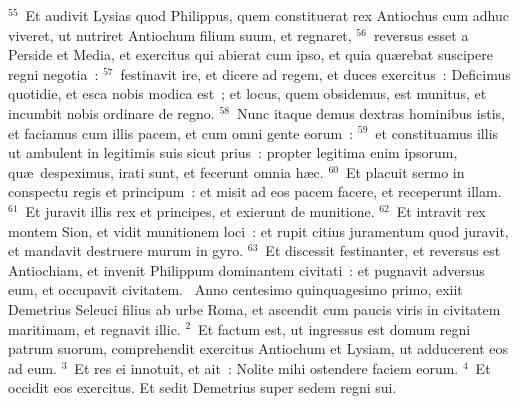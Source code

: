 ${}^{55}$~Et audivit Lysias quod Philippus, quem constituerat rex Antiochus cum adhuc viveret, ut nutriret Antiochum filium suum, et regnaret,
${}^{56}$~reversus esset a Perside et Media, et exercitus qui abierat cum ipso, et quia qu\ae rebat suscipere regni negotia~:
${}^{57}$~festinavit ire, et dicere ad regem, et duces exercitus~: Deficimus quotidie, et esca nobis modica est~; et locus, quem obsidemus, est munitus, et incumbit nobis ordinare de regno.
${}^{58}$~Nunc itaque demus dextras hominibus istis, et faciamus cum illis pacem, et cum omni gente eorum~:
${}^{59}$~et constituamus illis ut ambulent in legitimis suis sicut prius~: propter legitima enim ipsorum, qu\ae\ despeximus, irati sunt, et fecerunt omnia h\ae c.
${}^{60}$~Et placuit sermo in conspectu regis et principum~: et misit ad eos pacem facere, et receperunt illam.
${}^{61}$~Et juravit illis rex et principes, et exierunt de munitione.
${}^{62}$~Et intravit rex montem Sion, et vidit munitionem loci~: et rupit citius juramentum quod juravit, et mandavit destruere murum in gyro.
${}^{63}$~Et discessit festinanter, et reversus est Antiochiam, et invenit Philippum dominantem civitati~: et pugnavit adversus eum, et occupavit civitatem.
~\lettrine[lines=10,image=true,loversize=0.05,lraise=-0.03]{A}{}nno centesimo quinquagesimo primo, exiit Demetrius Seleuci filius ab urbe Roma, et ascendit cum paucis viris in civitatem maritimam, et regnavit illic.
${}^{2}$~Et factum est, ut ingressus est domum regni patrum suorum, comprehendit exercitus Antiochum et Lysiam, ut adducerent eos ad eum.
${}^{3}$~Et res ei innotuit, et ait~: Nolite mihi ostendere faciem eorum.
${}^{4}$~Et occidit eos exercitus. Et sedit Demetrius super sedem regni sui.


